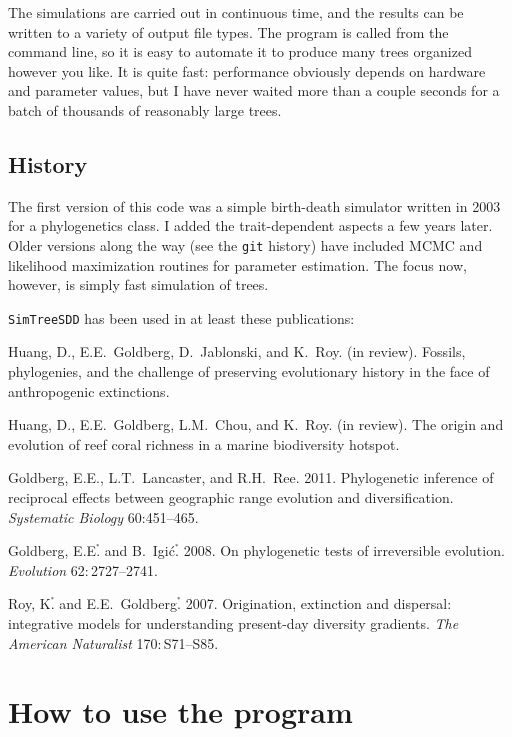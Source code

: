 \documentclass[10pt]{article}
\begin{document}
The simulations are carried out in continuous time, and the results can be written to a variety of output file types.
The program is called from the command line, so it is easy to automate it to produce many trees organized however you like.
It is quite fast: performance obviously depends on hardware and parameter values, but I have never waited more than a couple seconds for a batch of thousands of reasonably large trees.

\subsection*{History}

The first version of this code was a simple birth-death simulator written in 2003 for a phylogenetics class.
I added the trait-dependent aspects a few years later.
Older versions along the way (see the \texttt{git} history) have included MCMC and likelihood maximization routines for parameter estimation.
The focus now, however, is simply fast simulation of trees.

\texttt{SimTreeSDD} has been used in at least these publications:

Huang, D., E.E.~Goldberg, D.~Jablonski, and K.~Roy.
(in review).
Fossils, phylogenies, and the challenge of preserving evolutionary history in   the face of anthropogenic extinctions.

Huang, D., E.E.~Goldberg, L.M.~Chou, and K.~Roy.
(in review).
The origin and evolution of reef coral richness in a marine biodiversity hotspot.

Goldberg, E.E., L.T.~Lancaster, and R.H.~Ree. 2011.
Phylogenetic inference of reciprocal effects between geographic range evolution and diversification.
{\em Systematic Biology} 60:451--465.

Goldberg, E.E$\stackrel{^\ast}{\mbox{.}}$ and B.~Igi\'c$\stackrel{^\ast}{\mbox{.}}$ 2008.
On phylogenetic tests of irreversible evolution.
{\em Evolution} 62:$\,$2727--2741.

Roy, K$\stackrel{^\ast}{\mbox{.}}$ and E.E.~Goldberg$\stackrel{^\ast}{\mbox{.}}$ 2007.
Origination, extinction and dispersal: integrative models for understanding     present-day diversity gradients.
{\em The American Naturalist} 170:$\,$S71--S85.


\section*{How to use the program}
\end{document}
